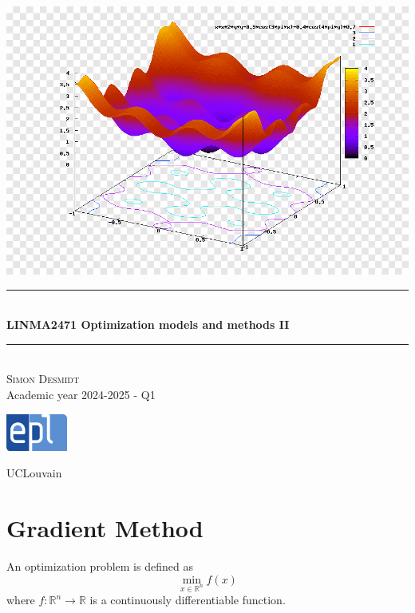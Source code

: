 \documentclass[12pt, openany]{report}
\newcommand{\HRule}{\rule{\linewidth}{0.5mm}}
\begin{document}
\begin{titlepage}
    \begin{sffamily}
    \begin{center}
        \includegraphics[scale=0.25]{img/page_de_garde.png} \\[1cm]
        \HRule \\[0.4cm]
        { \huge \bfseries LINMA2471 Optimization models and methods II \\[0.4cm] }
    
        \HRule \\[1.5cm]
        \textsc{\LARGE Simon Desmidt}\\[1cm]
        \vfill
        \vspace{2cm}
        {\large Academic year 2024-2025 - Q1}
        \vspace{0.4cm}
         
        \includegraphics[width=0.15\textwidth]{img/epl.png}
        
        UCLouvain\\
    
    \end{center}
    \end{sffamily}
\end{titlepage}

\setcounter{tocdepth}{1}
\tableofcontents
\chapter{Gradient Method}
An optimization problem is defined as 
\begin{equation}\label{eq:1}
    \min_{x\in \mathbb{R}^n} f(x)
\end{equation}
where \(f:\mathbb{R}^n\rightarrow\mathbb{R}\) is a continuously differentiable function. 
\end{document}
